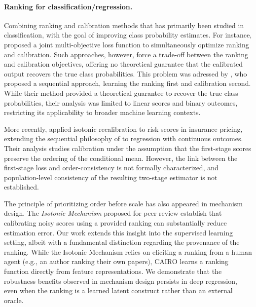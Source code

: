 \documentclass[11pt]{article}
\theoremstyle{plain}
\theoremstyle{plain}
\theoremstyle{plain}
\theoremstyle{plain}
\theoremstyle{plain}
\theoremstyle{plain}
\theoremstyle{plain}
\begin{document}
\paragraph{Ranking for classification/regression.}
 
Combining ranking and calibration methods that has primarily been studied in classification, with the goal of improving class probability estimates. For instance, \citet{sculley2010combined, yan2022scale} proposed a joint multi-objective loss function to simultaneously optimize ranking and calibration. Such approaches, however, force a trade-off between the ranking and calibration objectives, offering no theoretical guarantee that the calibrated output recovers the true class probabilities. This problem was adressed by \citet{menon2012predicting}, who proposed a sequential approach, learning the ranking first and calibration second. While their method provided a theoretical guarantee to recover the true class probabilities, their analysis was limited to linear scores and binary outcomes, restricting its applicability to broader machine learning contexts.

More recently, \citet{wuthrich2024isotonic} applied isotonic recalibration to risk scores in insurance pricing, extending the sequential philosophy of \citet{menon2012predicting} to regression with continuous outcomes. Their analysis studies calibration under the assumption that the first-stage scores preserve the ordering of the conditional mean. However, the link between the first-stage loss and order-consistency is not formally characterized, and population-level consistency of the resulting two-stage estimator is not established.


The principle of prioritizing order before scale has also appeared in mechanism design. The \emph{Isotonic Mechanism} proposed for peer review \citep{su2021you, yan2025isotonic, wu2025isotonic} establish that calibrating noisy scores using a provided ranking can substantially reduce estimation error.  Our work extends this insight into the supervised learning setting, albeit with a fundamental distinction regarding the provenance of the ranking. While the Isotonic Mechanism relies on eliciting a ranking from a human agent (e.g., an author ranking their own papers), CAIRO learns a ranking function directly from feature representations. We demonstrate that the robustness benefits observed in mechanism design persists in deep regression, even when the ranking is a learned latent construct rather than an external oracle.
\end{document}

